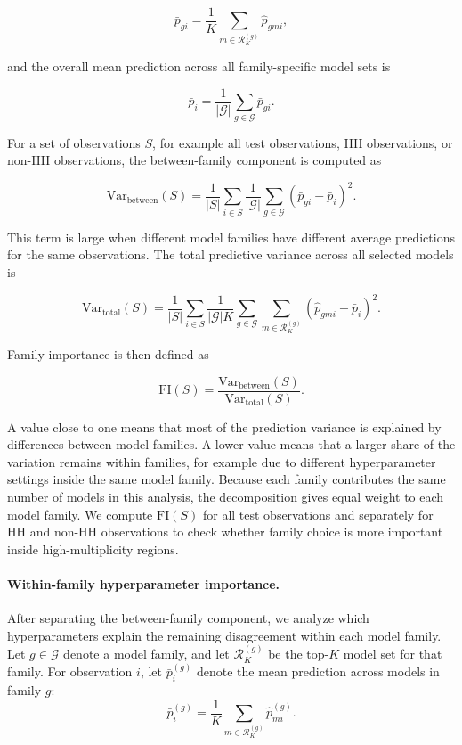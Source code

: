 \[
\bar{p}_{gi}
=
\frac{1}{K}\sum_{m \in \mathcal{R}^{(g)}_K} \hat{p}_{gmi},
\]

and the overall mean prediction across all family-specific model sets is

\[
\bar{p}_{i}
=
\frac{1}{|\mathcal{G}|}\sum_{g \in \mathcal{G}} \bar{p}_{gi}.
\]

For a set of observations \(S\), for example all test observations, HH observations, or
non-HH observations, the between-family component is computed as

\[
\mathrm{Var}_{\mathrm{between}}(S)
=
\frac{1}{|S|}\sum_{i \in S}
\frac{1}{|\mathcal{G}|}
\sum_{g \in \mathcal{G}}
\left(\bar{p}_{gi} - \bar{p}_{i}\right)^2 .
\]

This term is large when different model families have different average predictions for
the same observations. The total predictive variance across all selected models is

\[
\mathrm{Var}_{\mathrm{total}}(S)
=
\frac{1}{|S|}\sum_{i \in S}
\frac{1}{|\mathcal{G}|K}
\sum_{g \in \mathcal{G}}
\sum_{m \in \mathcal{R}^{(g)}_K}
\left(\hat{p}_{gmi} - \bar{p}_{i}\right)^2 .
\]

Family importance is then defined as

\[
\mathrm{FI}(S)
=
\frac{\mathrm{Var}_{\mathrm{between}}(S)}
{\mathrm{Var}_{\mathrm{total}}(S)}.
\]

A value close to one means that most of the prediction variance is explained by
differences between model families. A lower value means that a larger share of the
variation remains within families, for example due to different hyperparameter settings
inside the same model family. Because each family contributes the same number of models
in this analysis, the decomposition gives equal weight to each model family. We compute
\(\mathrm{FI}(S)\) for all test observations and separately for HH and non-HH observations
to check whether family choice is more important inside high-multiplicity regions.

\paragraph{Within-family hyperparameter importance.}

After separating the between-family component, we analyze which hyperparameters explain
the remaining disagreement within each model family. Let \(g \in \mathcal{G}\) denote a
model family, and let \(\mathcal{R}^{(g)}_K\) be the top-\(K\) model set for that family.
For observation \(i\), let \(\bar{p}^{(g)}_i\) denote the mean prediction across models in
family \(g\):
\[
\bar{p}^{(g)}_i
=
\frac{1}{K}
\sum_{m \in \mathcal{R}^{(g)}_K}
\hat{p}^{(g)}_{mi}.
\]


